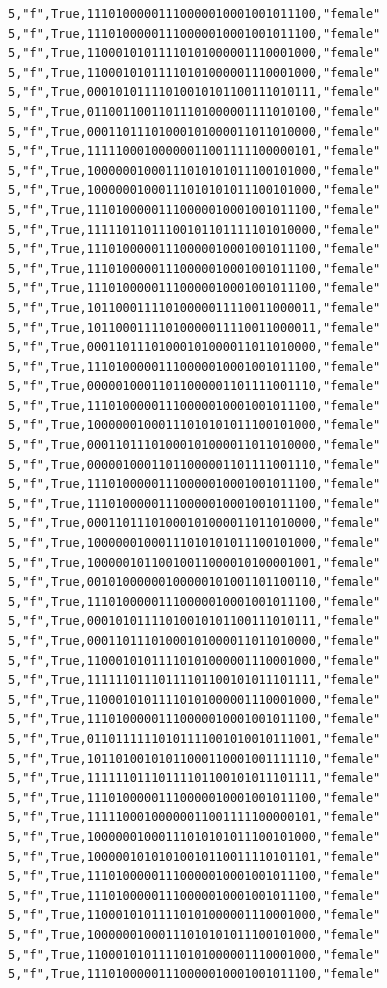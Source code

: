 \documentclass[authoryearcitations]{UoYCSproject}
\begin{document}
\begin{framed}
\begin{verbatim}
5,"f",True,11101000001110000010001001011100,"female"
5,"f",True,11101000001110000010001001011100,"female"
5,"f",True,11000101011110101000001110001000,"female"
5,"f",True,11000101011110101000001110001000,"female"
5,"f",True,00010101111010010101100111010111,"female"
5,"f",True,01100110011011101000001111010100,"female"
5,"f",True,00011011101000101000011011010000,"female"
5,"f",True,11111000100000011001111100000101,"female"
5,"f",True,10000001000111010101011100101000,"female"
5,"f",True,10000001000111010101011100101000,"female"
5,"f",True,11101000001110000010001001011100,"female"
5,"f",True,11111011011100101101111101010000,"female"
5,"f",True,11101000001110000010001001011100,"female"
5,"f",True,11101000001110000010001001011100,"female"
5,"f",True,11101000001110000010001001011100,"female"
5,"f",True,10110001111010000011110011000011,"female"
5,"f",True,10110001111010000011110011000011,"female"
5,"f",True,00011011101000101000011011010000,"female"
5,"f",True,11101000001110000010001001011100,"female"
5,"f",True,00000100011011000001101111001110,"female"
5,"f",True,11101000001110000010001001011100,"female"
5,"f",True,10000001000111010101011100101000,"female"
5,"f",True,00011011101000101000011011010000,"female"
5,"f",True,00000100011011000001101111001110,"female"
5,"f",True,11101000001110000010001001011100,"female"
5,"f",True,11101000001110000010001001011100,"female"
5,"f",True,00011011101000101000011011010000,"female"
5,"f",True,10000001000111010101011100101000,"female"
5,"f",True,10000010110010011000010100001001,"female"
5,"f",True,00101000000100000101001101100110,"female"
5,"f",True,11101000001110000010001001011100,"female"
5,"f",True,00010101111010010101100111010111,"female"
5,"f",True,00011011101000101000011011010000,"female"
5,"f",True,11000101011110101000001110001000,"female"
5,"f",True,11111101110111101100101011101111,"female"
5,"f",True,11000101011110101000001110001000,"female"
5,"f",True,11101000001110000010001001011100,"female"
5,"f",True,01101111110101111001010010111001,"female"
5,"f",True,10110100101011000110001001111110,"female"
5,"f",True,11111101110111101100101011101111,"female"
5,"f",True,11101000001110000010001001011100,"female"
5,"f",True,11111000100000011001111100000101,"female"
5,"f",True,10000001000111010101011100101000,"female"
5,"f",True,10000010101010010110011110101101,"female"
5,"f",True,11101000001110000010001001011100,"female"
5,"f",True,11101000001110000010001001011100,"female"
5,"f",True,11000101011110101000001110001000,"female"
5,"f",True,10000001000111010101011100101000,"female"
5,"f",True,11000101011110101000001110001000,"female"
5,"f",True,11101000001110000010001001011100,"female"

\end{verbatim}
\end{framed}
\end{document}
